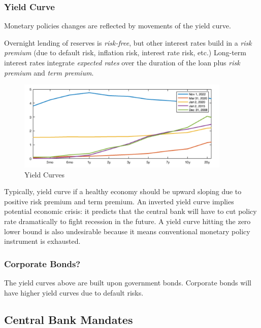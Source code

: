         \subsubsection{Yield Curve}
            Monetary policies changes are reflected by movements of the yield curve. 
            
            Overnight lending of reserves is \emph{risk-free}, but other interest rates build in a \emph{risk premium} (due to default risk, inflation risk, interest rate risk, etc.) Long-term interest rates integrate \emph{expected rates} over the duration of the loan plus \emph{risk premium} and \emph{term premium}.

            \begin{figure}[H]
                \centering
                \includegraphics[width=4in]{images/ch7/yield curve.png}
                \caption{Yield Curves}
            \end{figure}

            Typically, yield curve if a healthy economy should be upward sloping due to positive risk premium and term premium. An inverted yield curve implies potential economic crisis: it predicts that the central bank will have to cut policy rate dramatically to fight recession in the future. A yield curve hitting the zero lower bound is also undesirable because it means conventional monetary policy instrument is exhausted.

         \subsubsection{Corporate Bonds?}
            The yield curves above are built upon government bonds. Corporate bonds will have higher yield curves due to default risks.
        
    \subsection{Central Bank Mandates}
    

